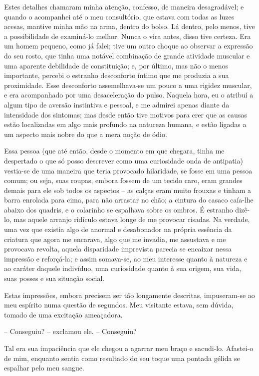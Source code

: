 Estes detalhes chamaram minha atenção, confesso, de maneira
desagradável; e quando o acompanhei até o meu consultório, que estava
com todas as luzes acesas, mantive minha mão na arma, dentro do bolso. 
Lá dentro, pelo menos, tive a possibilidade de examiná-lo melhor. 
Nunca o vira antes, disso tive certeza.  Era um homem pequeno, como já
falei; tive um outro choque ao observar a expressão do seu rosto, que
tinha uma notável combinação de grande atividade muscular e uma
aparente debilidade de constituição; e, por último, mas não o menos
importante, percebi o estranho desconforto íntimo que me produzia a sua
proximidade.  Esse desconforto assemelhava-se um pouco a uma rigidez
muscular, e era acompanhado por uma desaceleração do pulso.  Naquela
hora, eu o atribuí a algum tipo de aversão instintiva e pessoal, e me
admirei apenas diante da intensidade dos sintomas; mas desde então tive
motivos para crer que as causas estão localizadas em algo mais
profundo na natureza humana, e estão ligadas a um aspecto mais nobre do
que a mera noção de ódio.

Essa pessoa (que até então, desde o momento em que chegara, tinha me
despertado o que só posso descrever como uma curiosidade onda de
antipatia) vestia-se de uma maneira que teria provocado hilaridade, se
fosse em uma pessoa comum; ou seja, suas roupas, embora fossem de um
tecido caro, eram grandes demais para ele sob todos os aspectos -- as
calças eram muito frouxas e tinham a barra enrolada para cima, para não
arrastar no chão; a cintura do casaco caía-lhe abaixo dos quadris, e o
colarinho se espalhava sobre os ombros.  É estranho dizê-lo, mas aquele
arranjo ridículo estava longe de me provocar risadas.  Na verdade, uma
vez que existia algo de anormal e desabonador na própria essência da
criatura que agora me encarava, algo que me invadia, me assustava e me
provocava revolta, aquela disparidade imprevista parecia se encaixar
nessa impressão e reforçá-la; e assim somava-se, ao meu interesse
quanto à natureza e ao caráter daquele indivíduo, uma curiosidade
quanto à sua origem, sua vida, suas posses e sua situação social.

Estas impressões, embora precisem ser tão longamente descritas,
impuseram-se ao meu espírito numa questão de segundos.  Meu visitante
estava, sem dúvida, tomado de uma excitação ameaçadora. 

-- Conseguiu? -- exclamou ele. -- Conseguiu? 

Tal era sua impaciência que ele chegou a agarrar meu braço e sacudi-lo. 
Afastei-o de mim, enquanto sentia como resultado do seu toque uma
pontada gélida se espalhar pelo meu sangue.

